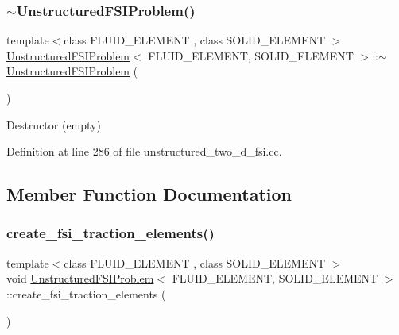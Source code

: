 \mbox{\label{classUnstructuredFSIProblem_a976a81e0dee902f6713bd8ca4d79d000}} 
\subsubsection{\texorpdfstring{$\sim$\+Unstructured\+F\+S\+I\+Problem()}{~UnstructuredFSIProblem()}}
{\footnotesize\ttfamily template$<$class F\+L\+U\+I\+D\+\_\+\+E\+L\+E\+M\+E\+NT , class S\+O\+L\+I\+D\+\_\+\+E\+L\+E\+M\+E\+NT $>$ \\
\hyperlink{classUnstructuredFSIProblem}{Unstructured\+F\+S\+I\+Problem}$<$ F\+L\+U\+I\+D\+\_\+\+E\+L\+E\+M\+E\+NT, S\+O\+L\+I\+D\+\_\+\+E\+L\+E\+M\+E\+NT $>$\+::$\sim$\hyperlink{classUnstructuredFSIProblem}{Unstructured\+F\+S\+I\+Problem} (\begin{DoxyParamCaption}{ }\end{DoxyParamCaption})\hspace{0.3cm}{\ttfamily [inline]}}



Destructor (empty) 



Definition at line 286 of file unstructured\+\_\+two\+\_\+d\+\_\+fsi.\+cc.



\subsection{Member Function Documentation}
\mbox{\label{classUnstructuredFSIProblem_a934a587c99668fca969a72814b3142a7}} 
\subsubsection{\texorpdfstring{create\+\_\+fsi\+\_\+traction\+\_\+elements()}{create\_fsi\_traction\_elements()}}
{\footnotesize\ttfamily template$<$class F\+L\+U\+I\+D\+\_\+\+E\+L\+E\+M\+E\+NT , class S\+O\+L\+I\+D\+\_\+\+E\+L\+E\+M\+E\+NT $>$ \\
void \hyperlink{classUnstructuredFSIProblem}{Unstructured\+F\+S\+I\+Problem}$<$ F\+L\+U\+I\+D\+\_\+\+E\+L\+E\+M\+E\+NT, S\+O\+L\+I\+D\+\_\+\+E\+L\+E\+M\+E\+NT $>$\+::create\+\_\+fsi\+\_\+traction\+\_\+elements (\begin{DoxyParamCaption}{ }\end{DoxyParamCaption})\hspace{0.3cm}{\ttfamily [private]}}



